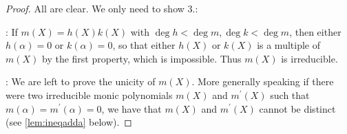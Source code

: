\documentclass{article}
\begin{document}
\begin{proof}
All are clear. We only need to show 3.:

: If $m(X)=h(X) k(X)$ with $\operatorname{deg} h<\operatorname{deg} m, \operatorname{deg} k<\operatorname{deg} m$, then either $h(\alpha)=0$ or $k(\alpha)=0$, so that either $h(X)$ or $k(X)$ is a multiple of $m(X)$ by the first property, which is impossible. Thus $m(X)$ is irreducible. 

: We are left to prove the unicity of $m(X)$. %
More generally speaking if there were two irreducible monic polynomials $m(X)$ and $m^{\prime}(X)$ such that $m(\alpha)=m^{\prime}(\alpha)=0$, we have that $m(X)$ and $m^{\prime}(X)$ cannot be distinct (see \cref{lem:ineqadda} below).
\end{proof}
\end{document}
